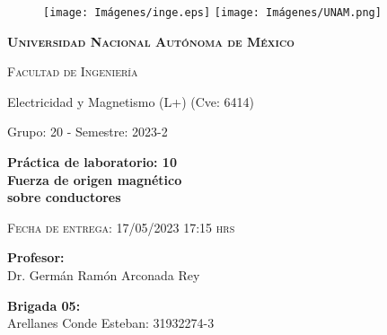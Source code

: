 \thispagestyle{empty}
			\begin{figure}[ht]
				\texttt{[image: Imágenes/inge.eps]}
				\label{escudoFI}
		   \endminipage
				\texttt{[image: Imágenes/UNAM.png]}
				\label{EscuoUNAM}
			\endminipage
		\end{figure}
		
		\vspace{0.1cm}
		
		\begin{center}
		    {\scshape\LARGE \textbf{Universidad Nacional Autónoma de México} \par}
			{\scshape\Large Facultad de Ingeniería\par}
            
             {\LARGE Electricidad y Magnetismo (L+) (Cve: 6414)}

			\begin{center}
			
			{\LARGE Grupo: 20 - Semestre: 2023-2}

            
			{\LARGE\bfseries Práctica de laboratorio: 10 \\ Fuerza de origen magnético \\ sobre conductores \par}

		{\scshape\Large Fecha de entrega: 17/05/2023 17:15 hrs \par}	

			        \LARGE	{ \textbf{Profesor:}}\\%
        \large		{ Dr. Germán Ramón Arconada Rey }
        
		\vspace{-0.5cm}	
		
		\LARGE	{ \textbf{Brigada 05:}}\\%

        \normalsize	 {Arellanes Conde Esteban: 31932274-3}
        
        

\end{center}
\end{center}
